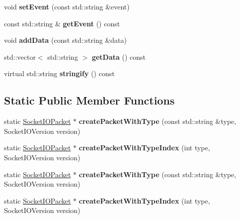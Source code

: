 \begin{DoxyCompactItemize}
\item 
\mbox{\label{classnetwork_1_1SocketIOPacket_ae67ca4a2967aaf0297aa115eaf564992}} 
void {\bfseries set\+Event} (const std\+::string \&event)
\item 
\mbox{\label{classnetwork_1_1SocketIOPacket_a420cbe758225310284fad3dad9f4123a}} 
const std\+::string \& {\bfseries get\+Event} () const
\item 
\mbox{\label{classnetwork_1_1SocketIOPacket_a6f9d25ea2705229b69e8688605412728}} 
void {\bfseries add\+Data} (const std\+::string \&data)
\item 
\mbox{\label{classnetwork_1_1SocketIOPacket_a07996c1e1cfeb4f096f798c6f1f610a3}} 
std\+::vector$<$ std\+::string $>$ {\bfseries get\+Data} () const
\item 
\mbox{\label{classnetwork_1_1SocketIOPacket_a3905bcbecf7b0f64a3e6a0b3192b1a1b}} 
virtual std\+::string {\bfseries stringify} () const
\end{DoxyCompactItemize}
\subsection*{Static Public Member Functions}
\begin{DoxyCompactItemize}
\item 
\mbox{\label{classnetwork_1_1SocketIOPacket_aa86f6a5cca0debe8cb4c51e9b73fbcba}} 
static \hyperlink{classnetwork_1_1SocketIOPacket}{Socket\+I\+O\+Packet} $\ast$ {\bfseries create\+Packet\+With\+Type} (const std\+::string \&type, Socket\+I\+O\+Version version)
\item 
\mbox{\label{classnetwork_1_1SocketIOPacket_a13dbcca75be9892c24db25e77a48628a}} 
static \hyperlink{classnetwork_1_1SocketIOPacket}{Socket\+I\+O\+Packet} $\ast$ {\bfseries create\+Packet\+With\+Type\+Index} (int type, Socket\+I\+O\+Version version)
\item 
\mbox{\label{classnetwork_1_1SocketIOPacket_accb25db055f641b13ee542e4c606d137}} 
static \hyperlink{classnetwork_1_1SocketIOPacket}{Socket\+I\+O\+Packet} $\ast$ {\bfseries create\+Packet\+With\+Type} (const std\+::string \&type, Socket\+I\+O\+Version version)
\item 
\mbox{\label{classnetwork_1_1SocketIOPacket_ab92ca74b215119a1377d7269e3a87cb6}} 
static \hyperlink{classnetwork_1_1SocketIOPacket}{Socket\+I\+O\+Packet} $\ast$ {\bfseries create\+Packet\+With\+Type\+Index} (int type, Socket\+I\+O\+Version version)
\end{DoxyCompactItemize}
